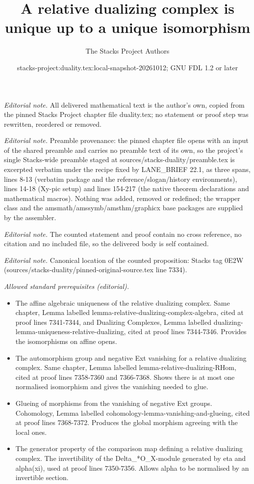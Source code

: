 \documentclass[10pt,a4paper]{amsart}
\title{A relative dualizing complex is unique up to a unique isomorphism}
\author{The Stacks Project Authors}
\date{stacks-project:duality.tex:local-snapshot-20261012; GNU FDL 1.2 or later}
\theoremstyle{plain}
\theoremstyle{definition}
\theoremstyle{remark}
\numberwithin{equation}{subsection}
\begin{document}
\maketitle
\noindent\textit{Editorial note.} All delivered mathematical text is the author's own, copied from the pinned Stacks Project chapter file duality.tex; no statement or proof step was rewritten, reordered or removed.\par\medskip
\noindent\textit{Editorial note.} Preamble provenance: the pinned chapter file opens with an input of the shared preamble and carries no preamble text of its own, so the project's single Stacks-wide preamble staged at sources/stacks-duality/preamble.tex is excerpted verbatim under the recipe fixed by LANE\_BRIEF 22.1, as three spans, lines 8-13 (verbatim package and the reference/slogan/history environments), lines 14-18 (Xy-pic setup) and lines 154-217 (the native theorem declarations and mathematical macros). Nothing was added, removed or redefined; the wrapper class and the amsmath/amssymb/amsthm/graphicx base packages are supplied by the assembler.\par\medskip
\noindent\textit{Editorial note.} The counted statement and proof contain no cross reference, no citation and no included file, so the delivered body is self contained.\par\medskip
\noindent\textit{Editorial note.} Canonical location of the counted proposition: Stacks tag 0E2W (sources/stacks-duality/pinned-original-source.tex line 7334).\par\medskip
\noindent\textit{Allowed standard prerequisites (editorial).}\begin{itemize}
\item The affine algebraic uniqueness of the relative dualizing complex. Same chapter, Lemma labelled lemma-relative-dualizing-complex-algebra, cited at proof lines 7341-7344, and Dualizing Complexes, Lemma labelled dualizing-lemma-uniqueness-relative-dualizing, cited at proof lines 7344-7346. Provides the isomorphisms on affine opens.
\item The automorphism group and negative Ext vanishing for a relative dualizing complex. Same chapter, Lemma labelled lemma-relative-dualizing-RHom, cited at proof lines 7358-7360 and 7366-7368. Shows there is at most one normalised isomorphism and gives the vanishing needed to glue.
\item Glueing of morphisms from the vanishing of negative Ext groups. Cohomology, Lemma labelled cohomology-lemma-vanishing-and-glueing, cited at proof lines 7368-7372. Produces the global morphism agreeing with the local ones.
\item The generator property of the comparison map defining a relative dualizing complex. The invertibility of the Delta\_*O\_X-module generated by eta and alpha(xi), used at proof lines 7350-7356. Allows alpha to be normalised by an invertible section.
\end{itemize}\medskip
\end{document}
